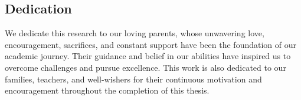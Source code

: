 

\begin{center}
    \section*{Dedication}
\end{center}
\large We dedicate this research to our loving parents, whose unwavering love,
    encouragement, sacrifices, and constant support have been the foundation
    of our academic journey. Their guidance and belief in our abilities have
    inspired us to overcome challenges and pursue excellence. This work is
    also dedicated to our families, teachers, and well-wishers for their
    continuous motivation and encouragement throughout the completion of this
    thesis.